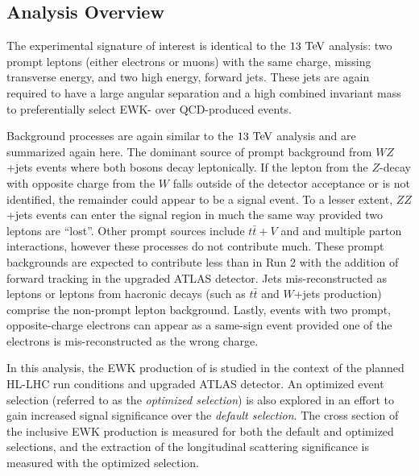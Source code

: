 \subsection{Analysis Overview}
The experimental signature of interest is identical to the $13\tev$ analysis: two prompt leptons (either electrons or muons) with the same charge, missing transverse energy, and two high energy, forward jets.
These jets are again required to have a large angular separation and a high combined invariant mass to preferentially select EWK- over QCD-produced \ssww events.

Background processes are again similar to the $13\tev$ analysis and are summarized again here. %
The dominant source of prompt background from $WZ$+jets events where both bosons decay leptonically.  
If the lepton from the $Z$-decay with opposite charge from the $W$ falls outside of the detector acceptance or is not identified, the remainder could appear to be a \ssww signal event.
To a lesser extent, $ZZ$+jets events can enter the signal region in much the same way provided two leptons are ``lost''.
Other prompt sources include $t\bar{t}+V$ and and multiple parton interactions, however these processes do not contribute much.
These prompt backgrounds are expected to contribute less than in Run 2 with the addition of forward tracking in the upgraded ATLAS detector.
Jets mis-reconstructed as leptons or leptons from hacronic decays (such as $t\bar{t}$ and $W$+jets production) comprise the non-prompt lepton background.
Lastly, events with two prompt, opposite-charge electrons can appear as a same-sign event provided one of the electrons is mis-reconstructed as the wrong charge.

In this analysis, the EWK production of \ssww is studied in the context of the planned HL-LHC run conditions and upgraded ATLAS detector.
An optimized event selection (referred to as the \emph{optimized selection}) is also explored in an effort to gain increased signal significance over the \emph{default selection}.
The cross section of the inclusive EWK production is measured for both the default and optimized selections, and the extraction of the longitudinal scattering significance is measured with the optimized selection.
